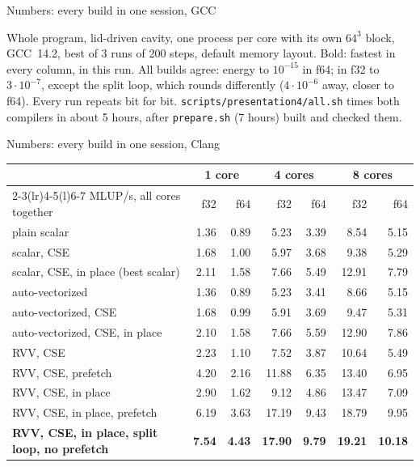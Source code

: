 \documentclass[aspectratio=169,10pt,t]{beamer}
\newcommand{\code}[1]{\texttt{#1}}
\begin{document}
\begin{frame}{Numbers: every build in one session, GCC}
  \vspace{3mm}
  \raggedright
  {\scriptsize\color{psgray}
  Whole program, lid-driven cavity, one process per core with its own $64^3$ block, GCC~14.2,
  best of 3 runs of 200 steps, default memory layout. Bold: fastest in every column, in this run. All builds
  agree: energy to $10^{-15}$ in f64; in f32 to $3\cdot 10^{-7}$, except the split loop, which rounds
  differently ($4\cdot 10^{-6}$ away, closer to f64). Every run repeats bit for bit.
  \code{scripts/presentation4/all.sh} times both compilers in about 5 hours, after \code{prepare.sh}
  (7 hours) built and checked them.\par}
\end{frame}

\begin{frame}{Numbers: every build in one session, Clang}
  \vspace{1mm}
  \centering
  {\footnotesize\renewcommand{\arraystretch}{1.05}
  \begin{tabular}{@{}lrrrrrr@{}}
    \toprule
    & \multicolumn{2}{c}{\textbf{1 core}} & \multicolumn{2}{c}{\textbf{4 cores}}
      & \multicolumn{2}{c}{\textbf{8 cores}}\\
    \cmidrule(lr){2-3}\cmidrule(lr){4-5}\cmidrule(l){6-7}
    MLUP/s, all cores together & f32 & f64 & f32 & f64 & f32 & f64\\
    \midrule
    plain scalar & 1.36 & 0.89 & 5.23 & 3.39 & 8.54 & 5.15\\
    scalar, CSE & 1.68 & 1.00 & 5.97 & 3.68 & 9.38 & 5.29\\
    scalar, CSE, in place (best scalar) & 2.11 & 1.58 & 7.66 & 5.49 & 12.91 & 7.79\\
    \midrule
    auto-vectorized & 1.36 & 0.89 & 5.23 & 3.41 & 8.66 & 5.15\\
    auto-vectorized, CSE & 1.68 & 0.99 & 5.91 & 3.69 & 9.47 & 5.31\\
    auto-vectorized, CSE, in place & 2.10 & 1.58 & 7.66 & 5.59 & 12.90 & 7.86\\
    \midrule
    RVV, CSE & 2.23 & 1.10 & 7.52 & 3.87 & 10.64 & 5.49\\
    RVV, CSE, prefetch & 4.20 & 2.16 & 11.88 & 6.35 & 13.40 & 6.95\\
    RVV, CSE, in place & 2.90 & 1.62 & 9.12 & 4.86 & 13.47 & 7.09\\
    RVV, CSE, in place, prefetch & 6.19 & 3.63 & 17.19 & 9.43 & 18.79 & 9.95\\
    \textbf{RVV, CSE, in place, split loop, no prefetch} & \textbf{7.54} & \textbf{4.43} & \textbf{17.90}
      & \textbf{9.79} & \textbf{19.21} & \textbf{10.18}\\
    \bottomrule
  \end{tabular}\par}


\end{frame}
\end{document}
